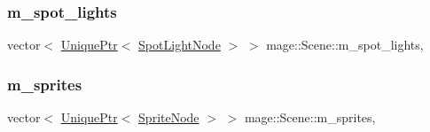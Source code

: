\hypertarget{classmage_1_1_scene_a52b564785e08b5945fcefc40d7bdbad6}{}\label{classmage_1_1_scene_a52b564785e08b5945fcefc40d7bdbad6} 
\subsubsection{\texorpdfstring{m\+\_\+spot\+\_\+lights}{m\_spot\_lights}}
{\footnotesize\ttfamily vector$<$ \hyperlink{namespacemage_a3316d7143a973e37adf1110f2e80ca31}{Unique\+Ptr}$<$ \hyperlink{namespacemage_aeed5dee4ff6c591eabb0e9114256df4a}{Spot\+Light\+Node} $>$ $>$ mage\+::\+Scene\+::m\+\_\+spot\+\_\+lights\hspace{0.3cm}{\ttfamily [mutable]}, {\ttfamily [private]}}

\hypertarget{classmage_1_1_scene_aab1c5a9895db0ba1df7bb00749962583}{}\label{classmage_1_1_scene_aab1c5a9895db0ba1df7bb00749962583} 
\subsubsection{\texorpdfstring{m\+\_\+sprites}{m\_sprites}}
{\footnotesize\ttfamily vector$<$ \hyperlink{namespacemage_a3316d7143a973e37adf1110f2e80ca31}{Unique\+Ptr}$<$ \hyperlink{classmage_1_1_sprite_node}{Sprite\+Node} $>$ $>$ mage\+::\+Scene\+::m\+\_\+sprites\hspace{0.3cm}{\ttfamily [mutable]}, {\ttfamily [private]}}

